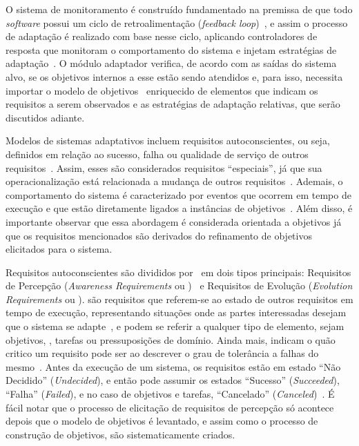 O sistema de monitoramento é construído fundamentado na premissa de que todo \textit{software} possui um ciclo de retroalimentação (\textit{feedback loop})~\cite{brun2009engineering}, e assim o processo de adaptação é realizado com base nesse ciclo, aplicando controladores de resposta que monitoram o comportamento do sistema e injetam estratégias de adaptação~\cite{souza2013awareness}. O módulo adaptador verifica, de acordo com as saídas do sistema alvo, se os objetivos internos a esse estão sendo atendidos e, para isso, necessita importar o modelo de objetivos~\cite{souza2013awareness} enriquecido de elementos que indicam os requisitos a serem observados e as estratégias de adaptação relativas, que serão discutidos adiante.

Modelos de sistemas adaptativos incluem requisitos autoconscientes, ou seja, definidos em relação ao sucesso, falha ou qualidade de serviço de outros requisitos~\cite{souza2013awareness}. Assim, esses são considerados requisitos ``especiais'', já que sua operacionalização está relacionada a mudança de outros requisitos~\cite{souza2012requirement}. Ademais, o comportamento do sistema é caracterizado por eventos que ocorrem em tempo de execução e que estão diretamente ligados a instâncias de objetivos~\cite{dalpiaz2013runtime}. Além disso, é importante observar que essa abordagem é considerada orientada a objetivos já que os requisitos mencionados são derivados do refinamento de objetivos elicitados para o sistema.

Requisitos autoconscientes são divididos por~\cite{souza2012requirement} em dois tipos principais: Requisitos de Percepção (\textit{Awareness Requirements} ou \awreqs)~\cite{souza2013awareness} e Requisitos de Evolução (\textit{Evolution Requirements} ou \evoreqs). \awreqs são requisitos que referem-se ao estado de outros requisitos em tempo de execução, representando situações onde as partes interessadas desejam que o sistema se adapte~\cite{souza2012requirement}, e podem se referir a qualquer tipo de elemento, sejam objetivos, \sofgoals, tarefas ou pressuposições de domínio. Ainda mais, \awreqs indicam o quão critico um requisito pode ser ao descrever o grau de tolerância a falhas do mesmo~\cite{souza2012requirement}. Antes da execução de um sistema, os requisitos estão em estado ``Não Decidido'' (\textit{Undecided}), e então pode assumir os estados ``Sucesso'' (\textit{Succeeded}), ``Falha'' (\textit{Failed}), e no caso de objetivos e tarefas, ``Cancelado'' (\textit{Canceled})~\cite{souza2013awareness}. É fácil notar que o processo de elicitação de requisitos de percepção só acontece depois que o modelo de objetivos é levantado, e assim como o processo de construção de objetivos, \awreqs são sistematicamente criados.


